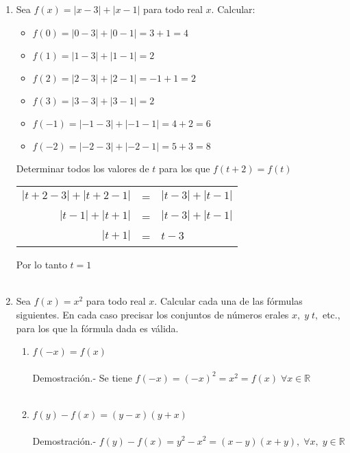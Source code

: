 \begin{enumerate}[ \bfseries 1.]
        \item Sea $f(x)=|x-3|+|x-1|$ para todo real $x$. Calcular:\\
            \begin{itemize}
                \item $f(0) = |0-3|+|0-1| = 3 + 1 = 4$
                \item $f(1) = |1-3|+|1-1| = 2$
                \item $f(2) = |2-3|+|2-1| = -1 + 1 = 2$
                \item $f(3) = |3-3|+|3-1| = 2$
                \item $f(-1) = |-1-3|+|-1-1| = 4 + 2 = 6$
                \item $f(-2) = |-2-3|+|-2-1| = 5 + 3 = 8$\\
            \end{itemize}
            Determinar todos los valores de $t$ para los que $f(t+2)=f(t)$\\
            \begin{center}
                \begin{tabular}{r c l}
                    $|t+2-3| + |t+2-1|$&=&$|t-3| + |t-1|$\\
                    $|t-1|+|t+1|$&=&$|t-3|+|t-1|$\\
                    $|t+1|$&=&$t-3$\\
                \end{tabular}
            \end{center}
            Por lo tanto  $t=1$\\\\

        \item Sea $f(x)=x^2$  para todo real $x$. Calcular cada una de las fórmulas siguientes. En cada caso precisar los conjuntos de números erales $x, \; y \; t,$ etc., para los que la fórmula dada es válida.
            \begin{enumerate}[\bfseries (a)]
                \item $f(-x)=f(x)$ \\\\
                Demostración.- \; Se tiene $f(-x) = (-x)^2 = x^2 = f(x) \; \forall x \in \mathbb{R}$\\\\

                \item $f(y)-f(x)=(y-x)(y+x)$\\\\
                Demostración.- \; $f(y)-f(x)= y^2 - x^2 = (x-y)(x+y), \; \forall x, \; y \in \mathbb{R}$\\\\


\end{enumerate}
\end{enumerate}
